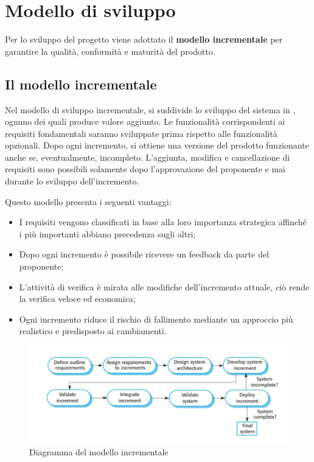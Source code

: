 \documentclass[../piano-di-progetto.tex]{subfiles}
\begin{document}
\section{Modello di sviluppo}
Per lo sviluppo del progetto viene adottato il \textbf{modello incrementale} per garantire la qualità, conformità e maturità del prodotto.
\subsection{Il modello incrementale}
Nel modello di sviluppo incrementale, si suddivide lo sviluppo del sistema in , ognuno dei quali produce valore aggiunto. Le funzionalità corrispondenti ai requisiti fondamentali saranno sviluppate prima rispetto alle funzionalità opzionali. Dopo ogni incremento, si ottiene una versione del prodotto funzionante anche se, eventualmente, incompleto. L’aggiunta, modifica e cancellazione di requisiti sono possibili solamente dopo l'approvazione del proponente e mai durante lo sviluppo dell'incremento.

Questo modello presenta i seguenti vantaggi:
\begin{itemize}
    \item I requisiti vengono classificati in base alla loro importanza strategica affinché i più importanti abbiano precedenza sugli altri;
    \item Dopo ogni incremento è possibile ricevere un feedback da parte del proponente;
    \item L'attività di verifica è mirata alle modifiche dell'incremento attuale, ciò rende la verifica veloce ed economica;
    \item Ogni incremento riduce il rischio di fallimento mediante un approccio più realistico e predisposto ai cambiamenti.

\end{itemize}

\begin{figure}[H]
	\centering
    \includegraphics[width=16cm]{img/modello-incrementale.png}
    \caption{Diagramma del modello incrementale} 
	\label{fig:modello-incrementale}
  \end{figure}
  
\end{document}

